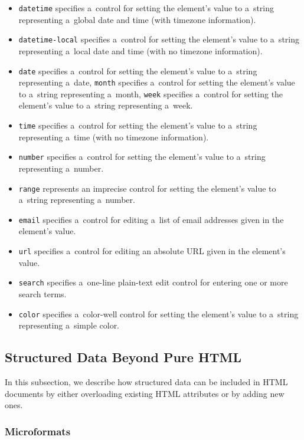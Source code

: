 \begin{itemize}
  \item \texttt{datetime} specifies a~control for setting the
        element’s value to a~string representing a~global date
        and time (with timezone information).
  \item \texttt{datetime-local} specifies a~control for setting
        the element’s value to a~string representing a~local date
        and time (with no timezone information).
  \item \texttt{date} specifies a~control for setting the
        element’s value to a~string representing a~date,
        \texttt{month} specifies a~control for setting the
        element’s value to a~string representing a~month,
        \texttt{week} specifies a~control for setting the
        element’s value to a~string representing a~week.
  \item \texttt{time} specifies a~control for setting the
        element’s value to a~string representing a~time
        (with no timezone information).
  \item \texttt{number} specifies a~control for setting the
        element’s value to a~string representing a~number.
  \item \texttt{range} represents an imprecise control
        for setting the element’s value to a~string
        representing a~number.
  \item \texttt{email} specifies a~control for editing
        a~list of email addresses given in the element’s value.
  \item \texttt{url} specifies a~control for editing an
        absolute URL given in the element’s value.
  \item \texttt{search} specifies a~one-line plain-text
        edit control for entering one or more search terms.
  \item \texttt{color} specifies a~color-well control for
        setting the element’s value to a~string representing
        a~simple color.
\end{itemize}

\subsection{Structured Data Beyond Pure HTML}

In this subsection, we describe how structured data
can be included in HTML documents
by either overloading existing HTML attributes
or by adding new ones.

\subsubsection{Microformats}

